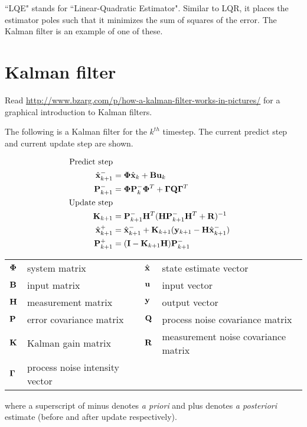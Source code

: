``LQE" stands for ``Linear-Quadratic Estimator". Similar to LQR, it places the
estimator poles such that it minimizes the sum of squares of the error. The
Kalman filter is an example of one of these.

\section{Kalman filter}

Read \url{http://www.bzarg.com/p/how-a-kalman-filter-works-in-pictures/} for a
graphical introduction to Kalman filters.

The following is a Kalman filter for the $k^{th}$ timestep. The current predict
step and current update step are shown.

\begin{theorem}
  \begin{align}
    \text{Predict step} \nonumber \\
    \hat{\mathbf{x}}_{k+1}^- &= \mathbf{\Phi}\hat{\mathbf{x}}_k + \mathbf{B} \mathbf{u}_k
      \label{eq:pre1_x} \\
    \mathbf{P}_{k+1}^- &= \mathbf{\Phi} \mathbf{P}_k^- \mathbf{\Phi}^T +
      \mathbf{\Gamma}\mathbf{Q}\mathbf{\Gamma}^T \\
    \text{Update step} \nonumber \\
    \mathbf{K}_{k+1} &=
      \mathbf{P}_{k+1}^- \mathbf{H}^T (\mathbf{H}\mathbf{P}_{k+1}^- \mathbf{H}^T +
      \mathbf{R})^{-1} \\
    \hat{\mathbf{x}}_{k+1}^+ &=
      \hat{\mathbf{x}}_{k+1}^- + \mathbf{K}_{k+1}(\mathbf{y}_{k+1} -
      \mathbf{H} \hat{\mathbf{x}}_{k+1}^-) \label{eq:post1_x} \\
    \mathbf{P}_{k+1}^+ &= (\mathbf{I} - \mathbf{K}_{k+1}\mathbf{H})\mathbf{P}_{k+1}^-
  \end{align}

  \begin{center}
    \renewcommand{\arraystretch}{1.3}
    \begin{tabulary}{\linewidth}{LLLL}
      $\mathbf{\Phi}$ & system matrix & $\hat{\mathbf{x}}$ & state estimate vector \\
      $\mathbf{B}$ & input matrix            & $\mathbf{u}$ & input vector \\
      $\mathbf{H}$ & measurement matrix      & $\mathbf{y}$ & output vector \\
      $\mathbf{P}$ & error covariance matrix & $\mathbf{Q}$ & process noise covariance
        matrix \\
      $\mathbf{K}$ & Kalman gain matrix & $\mathbf{R}$ & measurement noise covariance
        matrix \\
      $\mathbf{\Gamma}$ & process noise intensity vector &
    \end{tabulary}
  \end{center}

  where a superscript of minus denotes \textit{a priori} and plus denotes
  \textit{a posteriori} estimate (before and after update respectively).
\end{theorem}

